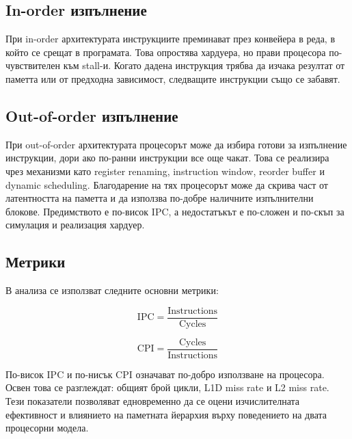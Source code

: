 \documentclass[12pt,a4paper]{article}
\begin{document}
\subsection{In-order изпълнение}
При in-order архитектурата инструкциите преминават през конвейера в реда, в който се срещат в програмата. Това опростява хардуера, но прави процесора по-чувствителен към stall-и. Когато дадена инструкция трябва да изчака резултат от паметта или от предходна зависимост, следващите инструкции също се забавят.

\subsection{Out-of-order изпълнение}
При out-of-order архитектурата процесорът може да избира готови за изпълнение инструкции, дори ако по-ранни инструкции все още чакат. Това се реализира чрез механизми като register renaming, instruction window, reorder buffer и dynamic scheduling. Благодарение на тях процесорът може да скрива част от латентността на паметта и да използва по-добре наличните изпълнителни блокове. Предимството е по-висок IPC, а недостатъкът е по-сложен и по-скъп за симулация и реализация хардуер.

\subsection{Метрики}
В анализа се използват следните основни метрики:

\begin{equation}
\text{IPC} = \frac{\text{Instructions}}{\text{Cycles}}
\end{equation}

\begin{equation}
\text{CPI} = \frac{\text{Cycles}}{\text{Instructions}}
\end{equation}

По-висок IPC и по-нисък CPI означават по-добро използване на процесора. Освен това се разглеждат:
общият брой цикли, L1D miss rate и L2 miss rate. Тези показатели позволяват едновременно да се оцени изчислителната ефективност и влиянието на паметната йерархия върху поведението на двата процесорни модела.
\end{document}

